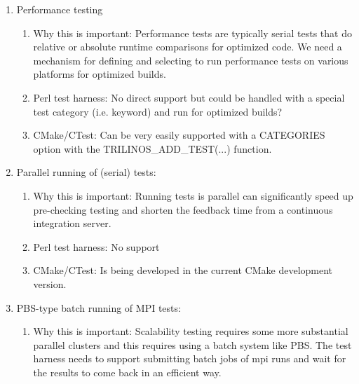 \documentclass[pdf,ps2pdf,11pt]{SANDreport}
\begin{document}
\begin{enumerate}

{}\item Performance testing

  \begin{enumerate}

  {}\item Why this is important: Performance tests are typically
  serial tests that do relative or absolute runtime comparisons for
  optimized code.  We need a mechanism for defining and selecting to
  run performance tests on various platforms for optimized builds.

  {}\item Perl test harness: No direct support but could be handled
  with a special test category (i.e. keyword) and run for optimized
  builds?

  {}\item CMake/CTest: Can be very easily supported with a CATEGORIES
  option with the TRILINOS\_ADD\_TEST(...) function.

  \end{enumerate}

{}\item Parallel running of (serial) tests:

  \begin{enumerate}

  {}\item Why this is important: Running tests is parallel can
  significantly speed up pre-checking testing and shorten the feedback
  time from a continuous integration server.

  {}\item Perl test harness: No support

  {}\item CMake/CTest: Is being developed in the current CMake
  development version.

  \end{enumerate}

{}\item PBS-type batch running of MPI tests:

  \begin{enumerate}

  {}\item Why this is important: Scalability testing requires some
  more substantial parallel clusters and this requires using a batch
  system like PBS.  The test harness needs to support submitting
  batch jobs of mpi runs and wait for the results to come back in an
  efficient way.


\end{enumerate}
\end{enumerate}
\end{document}
